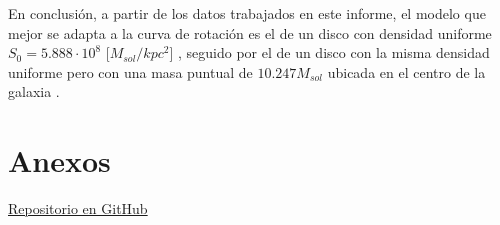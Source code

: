 \documentclass[letterpaper,oneside]{article}
\begin{document}
En conclusión, a partir de los datos trabajados en este informe, el modelo que mejor se adapta a la curva de rotación es el de un disco con densidad uniforme $S_0 = 5.888 \cdot 10^{8}$ [$M_{sol}/kpc^{2}$] , seguido por el de un disco con la misma densidad uniforme pero con una masa puntual de  $10.247 M_{sol}$ ubicada en el centro de la galaxia . 

\section{Anexos}
\href{https://github.com/vecheto/astro_experimental/tree/main/Tarea\%202}{Repositorio en GitHub}
\end{document}
